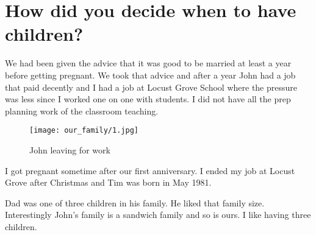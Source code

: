 \section{How did you decide when to have children?}
We had been given the advice that it was good to be married at least a year before getting pregnant.
We took that advice and after a year John had a job that paid decently and I had a job at Locust Grove School where the pressure was less since I worked one on one with students.
I did not have all the prep planning work of the classroom teaching.
\begin{figure}
\centering
\texttt{[image: our\_family/1.jpg]}
\caption{
John leaving for work
}
\end{figure}

I got pregnant sometime after our first anniversary.
I ended my job at Locust Grove after Christmas and Tim was born in May 1981.

Dad was one of three children in his family.
He liked that family size.
Interestingly John's family is a sandwich family and so is ours.
I like having three children.





